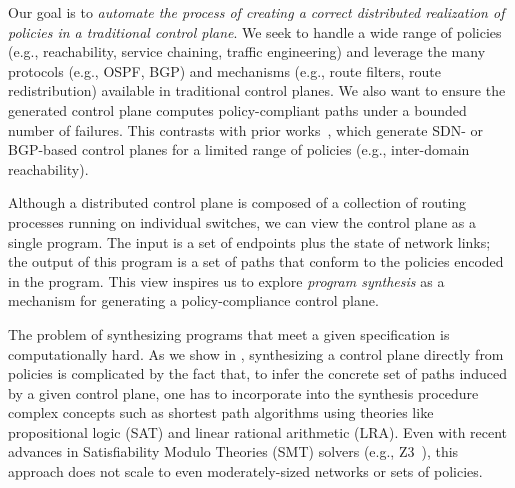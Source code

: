 Our goal is to {\em automate the process of creating a correct distributed
realization of policies in a traditional control plane}. We seek to handle
a wide range of policies (e.g., reachability, service chaining, traffic
engineering) and leverage the many protocols (e.g., OSPF, BGP) and mechanisms
(e.g., route filters, route redistribution) available in traditional control
planes. We also want to ensure the generated control plane computes
policy-compliant paths under a bounded number of failures. This contrasts with
prior works~\cite{netegg, propane}, which generate SDN- or BGP-based
control planes for a limited range of policies (e.g., inter-domain
reachability).

Although a distributed control plane is composed of a collection of routing
processes running on individual switches, we can view the control plane as a
single program. The input is a set of endpoints plus the state of network
links; the output of this program is a set of paths that conform to the
policies encoded in the program. This view inspires us to explore {\em program
synthesis} as a mechanism for generating a policy-compliance control plane.



The problem of synthesizing programs that meet a given specification
is computationally hard. 
As we show in , synthesizing a control plane
directly from policies is complicated by the fact that, to infer the concrete
set of paths induced by a given control plane, one has to incorporate
into the synthesis procedure complex concepts such as shortest path algorithms
using theories like propositional logic (SAT) and linear rational
arithmetic (LRA). Even with recent advances in Satisfiability Modulo Theories
(SMT) solvers (e.g., Z3~\cite{z3}), this approach does not scale to
even moderately-sized networks or sets of policies.

